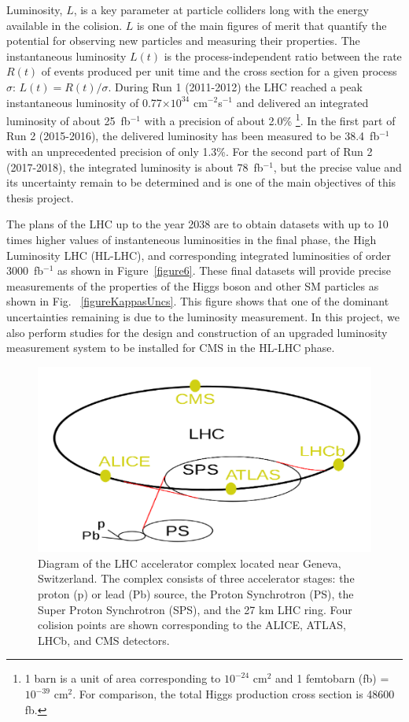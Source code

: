 \documentclass[final,12p]{article}
\newcommand{\lumi}[1]{{#1~fb$^{-1}$}}
\newcommand{\instlumi}[1]{#1$\times 10^{34}$ cm$^{-2}$s$^{-1}$} }
\begin{document}
Luminosity, $L$, is a key parameter at particle colliders long with the energy available in the colision.
$L$ is one of the  main figures of merit that quantify the potential for observing new particles and measuring their properties.
The instantaneous luminosity $L(t)$ is the process-independent ratio between the rate $R(t)$ of events produced per unit time and the cross section for a given process $\sigma$: $L(t) = R(t)/\sigma$.
During Run 1 (2011-2012) the LHC reached a peak instantaneous luminosity of \instlumi{0.77} and delivered an integrated luminosity of about \lumi{25} with a precision of about 2.0\% 
\footnote{1 barn is a unit of area corresponding to $10^{-24}$ cm${^2}$ and 1 femtobarn (fb) = $10^{-39}$ cm$^{2}$. For comparison, the total Higgs production cross section is 48600 fb.}.
In the first part of Run 2 (2015-2016), the delivered luminosity has been measured to be \lumi{38.4} with an unprecedented precision of only 1.3\%.
For the second part of Run 2 (2017-2018), the integrated luminosity is about \lumi{78}, but the precise value and its uncertainty remain to be determined and is one of the main objectives of this thesis project.

The plans of the LHC up to the year 2038 are to obtain datasets with up to 10 times higher values of instanteneous luminosities in the final phase, the  High Luminosity LHC (HL-LHC), and corresponding integrated luminosities of order \lumi{3000} as shown in Figure~\ref{figure6}.
These final datasets will provide  precise measurements of the properties of the Higgs boson and other SM particles as shown in Fig. ~\ref{figureKappasUncs}.
This figure shows that one of the dominant uncertainties remaining is due to the luminosity measurement.
In this project, we also perform studies for the design and construction of an upgraded luminosity measurement system to be installed for CMS in the HL-LHC phase.



\begin{figure}[H]
  \centering
  \includegraphics[width=0.7\columnwidth]{./LHCcomplex.png}
  \caption{Diagram of the LHC accelerator complex located near Geneva, Switzerland. The complex consists of three accelerator stages: the proton (p) or lead (Pb) source, the Proton Synchrotron (PS), the Super Proton Synchrotron (SPS), and the 27 km LHC ring. Four colision points are shown corresponding to the ALICE, ATLAS, LHCb, and CMS detectors. }
  \label{figure5}
\end{figure}
\end{document}
